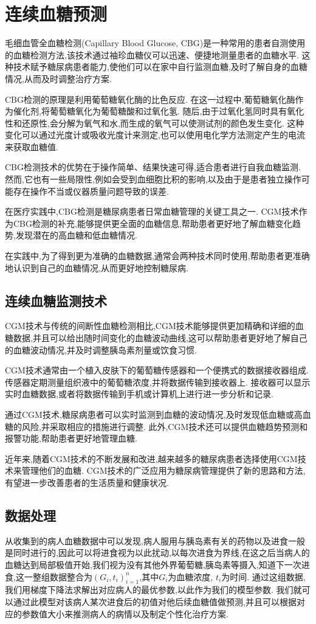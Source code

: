 \chapter{连续血糖预测}\label{chap:predict}

毛细血管全血糖检测(Capillary Blood Glucose, CBG)是一种常用的患者自测使用的血糖检测方法,该技术通过袖珍血糖仪可以迅速、便捷地测量患者的血糖水平. 这种技术赋予糖尿病患者能力,使他们可以在家中自行监测血糖,及时了解自身的血糖情况,从而及时调整治疗方案. 

CBG检测的原理是利用葡萄糖氧化酶的比色反应. 在这一过程中,葡萄糖氧化酶作为催化剂,将葡萄糖氧化为葡萄糖酸和过氧化氢. 随后,由于过氧化氢同时具有氧化性和还原性,会分解为氧气和水,而生成的氧气可以使测试剂的颜色发生变化. 这种变化可以通过光度计或吸收光度计来测定,也可以使用电化学方法测定产生的电流来获取血糖值. 

CBG检测技术的优势在于操作简单、结果快速可得,适合患者进行自我血糖监测. 然而,它也有一些局限性,例如会受到血细胞比积的影响,以及由于是患者独立操作可能存在操作不当或仪器质量问题导致的误差. 

在医疗实践中,CBG检测是糖尿病患者日常血糖管理的关键工具之一. CGM技术作为CBG检测的补充,能够提供更全面的血糖信息,帮助患者更好地了解血糖变化趋势,发现潜在的高血糖和低血糖情况. 

在实践中,为了得到更为准确的血糖数据,通常会两种技术同时使用,帮助患者更准确地认识到自己的血糖情况,从而更好地控制糖尿病. 

\section{连续血糖监测技术}
CGM技术与传统的间断性血糖检测相比,CGM技术能够提供更加精确和详细的血糖数据,并且可以给出随时间变化的血糖波动曲线,这可以帮助患者更好地了解自己的血糖波动情况,并及时调整胰岛素剂量或饮食习惯. 

CGM技术通常由一个植入皮肤下的葡萄糖传感器和一个便携式的数据接收器组成. 传感器定期测量组织液中的葡萄糖浓度,并将数据传输到接收器上. 接收器可以显示实时血糖数据,或者将数据传输到手机或计算机上进行进一步分析和记录. 

通过CGM技术,糖尿病患者可以实时监测到血糖的波动情况,及时发现低血糖或高血糖的风险,并采取相应的措施进行调整. 此外,CGM技术还可以提供血糖趋势预测和报警功能,帮助患者更好地管理血糖\cite{vigersky2017role}. 

近年来,随着CGM技术的不断发展和改进,越来越多的糖尿病患者选择使用CGM技术来管理他们的血糖. CGM技术的广泛应用为糖尿病管理提供了新的思路和方法,有望进一步改善患者的生活质量和健康状况. 
\section{数据处理}
从收集到的病人血糖数据\cite{zhao2023chinese}中可以发现,病人服用与胰岛素有关的药物以及进食一般是同时进行的,因此可以将进食视为以此扰动,以每次进食为界线,在这之后当病人的血糖达到局部极值开始,我们视为没有其他外界葡萄糖,胰岛素等摄入,知道下一次进食,这一整组数据整合为$(G_i,t_i)_{i=1}^n$,其中$G_i$为血糖浓度, $t_i$为时间. 通过这组数据,我们用梯度下降法求解出对应病人的最优参数,以此作为我们的模型参数. 我们就可以通过此模型对该病人某次进食后的初值对他后续血糖值做预测,并且可以根据对应的参数值大小来推测病人的病情以及制定个性化治疗方案. 

